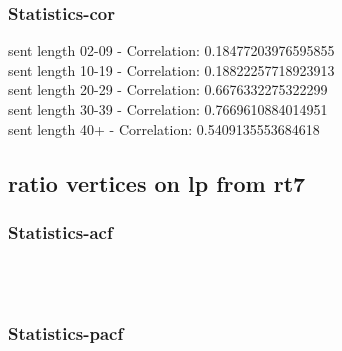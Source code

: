 \documentclass{article}%
\begin{document}
%
\newpage%
\subsubsection{Statistics{-}cor}%
\label{ssubsec:Statistics{-}cor}%
\noindent%
sent length 02-09 - Correlation: 0.18477203976595855\\%
sent length 10-19 - Correlation: 0.18822257718923913\\%
sent length 20-29 - Correlation: 0.6676332275322299\\%
sent length 30-39 - Correlation: 0.7669610884014951\\%
sent length 40+ - Correlation: 0.5409135553684618\\

%
\newpage

%
\subsection{ratio vertices on lp from rt7}%
\label{subsec:ratioverticesonlpfromrt7}%
\subsubsection{Statistics{-}acf}%
\label{ssubsec:Statistics{-}acf}%


\begin{figure}[ht]%
\centering%
\setlength{\abovecaptionskip}{-35pt}%
%
%
\\%
%
%
\\%
%
\end{figure}

%
\newpage%
\subsubsection{Statistics{-}pacf}%
\label{ssubsec:Statistics{-}pacf}%
\end{document}
